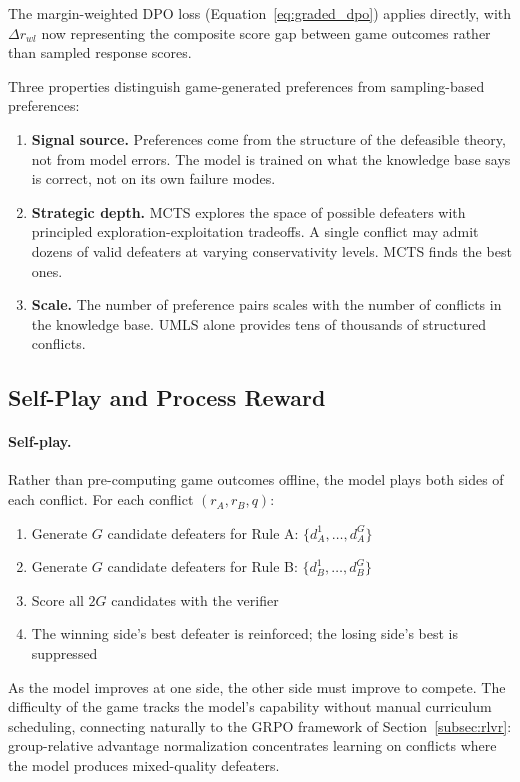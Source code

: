 \documentclass{article}
\theoremstyle{definition}
\begin{document}
The margin-weighted DPO loss (Equation~\ref{eq:graded_dpo}) applies directly, with $\Delta r_{wl}$ now representing the composite score gap between game outcomes rather than sampled response scores.

Three properties distinguish game-generated preferences from sampling-based preferences:

\begin{enumerate}[nosep]
    \item \textbf{Signal source.} Preferences come from the structure of the defeasible theory, not from model errors. The model is trained on what the knowledge base says is correct, not on its own failure modes.
    \item \textbf{Strategic depth.} MCTS explores the space of possible defeaters with principled exploration-exploitation tradeoffs. A single conflict may admit dozens of valid defeaters at varying conservativity levels. MCTS finds the best ones.
    \item \textbf{Scale.} The number of preference pairs scales with the number of conflicts in the knowledge base. UMLS alone provides tens of thousands of structured conflicts.
\end{enumerate}


\subsection{Self-Play and Process Reward}\label{subsec:selfplay}

\paragraph{Self-play.} Rather than pre-computing game outcomes offline, the model plays both sides of each conflict. For each conflict $(r_A, r_B, q)$:
\begin{enumerate}[nosep]
    \item Generate $G$ candidate defeaters for Rule A: $\{d_A^1, \ldots, d_A^G\}$
    \item Generate $G$ candidate defeaters for Rule B: $\{d_B^1, \ldots, d_B^G\}$
    \item Score all $2G$ candidates with the verifier
    \item The winning side's best defeater is reinforced; the losing side's best is suppressed
\end{enumerate}
As the model improves at one side, the other side must improve to compete. The difficulty of the game tracks the model's capability without manual curriculum scheduling, connecting naturally to the GRPO framework of Section~\ref{subsec:rlvr}: group-relative advantage normalization concentrates learning on conflicts where the model produces mixed-quality defeaters.
\end{document}
